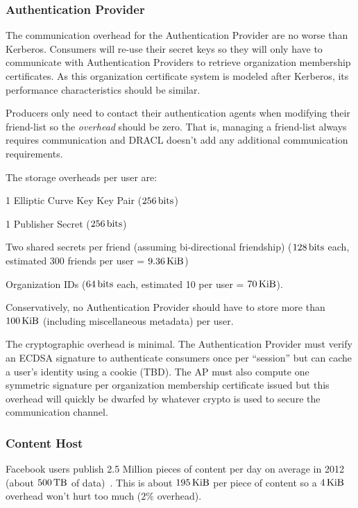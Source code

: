 \documentclass[pdftex,12pt,a4papaer]{article}
\begin{document}
\subsubsection{Authentication Provider}

The communication overhead for the Authentication Provider are no worse than
Kerberos. Consumers will re-use their secret keys so they will only have to
communicate with Authentication Providers to retrieve organization membership
certificates. As this organization certificate system is modeled after Kerberos,
its performance characteristics should be similar.

Producers only need to contact their authentication agents when modifying their
friend-list so the \emph{overhead} should be zero. That is, managing a
friend-list always requires communication and DRACL doesn't add any additional
communication requirements.

The storage overheads per user are:

\begin{compactitem}
\item 1 Elliptic Curve Key Key Pair ($\unit[256]{bits}$)
\item 1 Publisher Secret ($\unit[256]{bits}$)
\item Two shared secrets per friend (assuming bi-directional friendship)
    ($\unit[128]{bits}$ each, estimated 300 friends per user = $\unit[9.36]{KiB}$)
\item Organization IDs ($\unit[64]{bits}$ each, estimated 10 per user = $\unit[70]{KiB}$).
\end{compactitem}

Conservatively, no Authentication Provider should have to store more than
$\unit[100]{KiB}$ (including miscellaneous metadata) per user.

The cryptographic overhead is minimal. The Authentication Provider must verify
an ECDSA signature to authenticate consumers once per ``session'' but can cache
a user's identity using a cookie (TBD). The AP must also compute one symmetric
signature per organization membership certificate issued but this overhead will
quickly be dwarfed by whatever crypto is used to secure the communication
channel.

\subsubsection{Content Host}

Facebook users publish 2.5 Million pieces of content per day on average in 2012
(about $\unit[500]{TB}$ of data)~\cite{fbnum}. This is about $\unit[195]{KiB}$
per piece of content so a $\unit[4]{KiB}$ overhead won't hurt too much ($2\%$
overhead).
\end{document}
